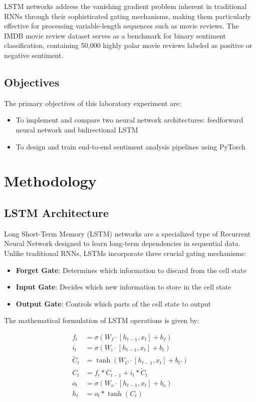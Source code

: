 \documentclass[a4paper, journal]{IEEEtran}
\begin{document}
LSTM networks address the vanishing gradient problem inherent in traditional RNNs through their sophisticated gating mechanisms, making them particularly effective for processing variable-length sequences such as movie reviews. The IMDB movie review dataset serves as a benchmark for binary sentiment classification, containing 50,000 highly polar movie reviews labeled as positive or negative sentiment.

\subsection{Objectives}

The primary objectives of this laboratory experiment are:
\begin{itemize}
    \item To implement and compare two neural network architectures: feedforward neural network and bidirectional LSTM
    
    \item To design and train end-to-end sentiment analysis pipelines using PyTorch
\end{itemize}

\section{Methodology}

\subsection{LSTM Architecture}

Long Short-Term Memory (LSTM) networks are a specialized type of Recurrent Neural Network designed to learn long-term dependencies in sequential data. Unlike traditional RNNs, LSTMs incorporate three crucial gating mechanisms:

\begin{itemize}
    \item \textbf{Forget Gate}: Determines which information to discard from the cell state
    \item \textbf{Input Gate}: Decides which new information to store in the cell state
    \item \textbf{Output Gate}: Controls which parts of the cell state to output
\end{itemize}

The mathematical formulation of LSTM operations is given by:

\begin{align}
f_t &= \sigma(W_f \cdot [h_{t-1}, x_t] + b_f) \\
i_t &= \sigma(W_i \cdot [h_{t-1}, x_t] + b_i) \\
\tilde{C}_t &= \tanh(W_C \cdot [h_{t-1}, x_t] + b_C) \\
C_t &= f_t * C_{t-1} + i_t * \tilde{C}_t \\
o_t &= \sigma(W_o \cdot [h_{t-1}, x_t] + b_o) \\
h_t &= o_t * \tanh(C_t)
\end{align}
\end{document}

